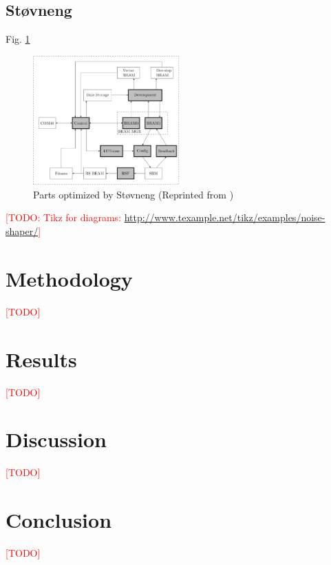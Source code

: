 \documentclass[a4paper]{IEEEtran}
\newcommand\TODO{\textcolor{red}{[TODO]}}
\newcommand\todo[1]{\textcolor{red}{[TODO: #1]}}
\begin{document}
\subsection{Støvneng \cite{stovneng2014sblock}}

Fig. \ref{fig:ca-stovneng}

\begin{figure}[h!]
    \centering
    \includegraphics[width=0.5\textwidth]{figures/ca-stovneng}
    \caption{Parts optimized by Støvneng (Reprinted from \cite{stovneng2014sblock})}
    \label{fig:ca-stovneng}
\end{figure}

\todo{Tikz for diagrams: \url{http://www.texample.net/tikz/examples/noise-shaper/}}

\section{Methodology}

\TODO

\section{Results}

\TODO

\section{Discussion}

\TODO

\section{Conclusion}

\TODO



\end{document}
